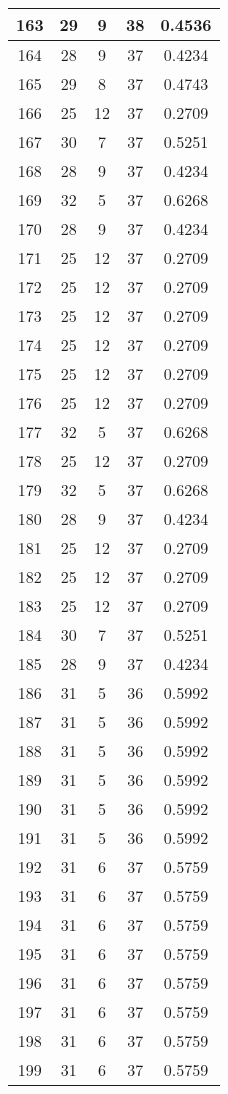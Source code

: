 \documentclass[letterpaper, 12pt]{article}
\begin{document}
\begin{longtable}{|c|c|c|c|c|}
\hline
163 & 29 & 9 & 38 & 0.4536 \\
\hline
164 & 28 & 9 & 37 & 0.4234 \\
\hline
165 & 29 & 8 & 37 & 0.4743 \\
\hline
166 & 25 & 12 & 37 & 0.2709 \\
\hline
167 & 30 & 7 & 37 & 0.5251 \\
\hline
168 & 28 & 9 & 37 & 0.4234 \\
\hline
169 & 32 & 5 & 37 & 0.6268 \\
\hline
170 & 28 & 9 & 37 & 0.4234 \\
\hline
171 & 25 & 12 & 37 & 0.2709 \\
\hline
172 & 25 & 12 & 37 & 0.2709 \\
\hline
173 & 25 & 12 & 37 & 0.2709 \\
\hline
174 & 25 & 12 & 37 & 0.2709 \\
\hline
175 & 25 & 12 & 37 & 0.2709 \\
\hline
176 & 25 & 12 & 37 & 0.2709 \\
\hline
177 & 32 & 5 & 37 & 0.6268 \\
\hline
178 & 25 & 12 & 37 & 0.2709 \\
\hline
179 & 32 & 5 & 37 & 0.6268 \\
\hline
180 & 28 & 9 & 37 & 0.4234 \\
\hline
181 & 25 & 12 & 37 & 0.2709 \\
\hline
182 & 25 & 12 & 37 & 0.2709 \\
\hline
183 & 25 & 12 & 37 & 0.2709 \\
\hline
184 & 30 & 7 & 37 & 0.5251 \\
\hline
185 & 28 & 9 & 37 & 0.4234 \\
\hline
186 & 31 & 5 & 36 & 0.5992 \\
\hline
187 & 31 & 5 & 36 & 0.5992 \\
\hline
188 & 31 & 5 & 36 & 0.5992 \\
\hline
189 & 31 & 5 & 36 & 0.5992 \\
\hline
190 & 31 & 5 & 36 & 0.5992 \\
\hline
191 & 31 & 5 & 36 & 0.5992 \\
\hline
192 & 31 & 6 & 37 & 0.5759 \\
\hline
193 & 31 & 6 & 37 & 0.5759 \\
\hline
194 & 31 & 6 & 37 & 0.5759 \\
\hline
195 & 31 & 6 & 37 & 0.5759 \\
\hline
196 & 31 & 6 & 37 & 0.5759 \\
\hline
197 & 31 & 6 & 37 & 0.5759 \\
\hline
198 & 31 & 6 & 37 & 0.5759 \\
\hline
199 & 31 & 6 & 37 & 0.5759 \\
\hline
\end{longtable}
\end{document}
